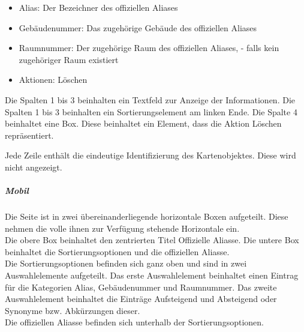 \begin{itemize}
    \item Alias: Der Bezeichner des offiziellen Aliases
    \item Gebäudenummer: Das zugehörige Gebäude des offiziellen Aliases
    \item Raumnummer: Der zugehörige Raum des offiziellen Aliases, \dq - \dq{} falls kein zugehöriger Raum existiert
    \item Aktionen: Löschen
\end{itemize}

Die Spalten 1 bis 3 beinhalten ein Textfeld zur Anzeige der Informationen.
Die Spalten 1 bis 3 beinhalten ein Sortierungselement am linken Ende.
Die Spalte 4 beinhaltet eine Box. Diese beinhaltet ein Element, dass die Aktion \dq Löschen \dq{} repräsentiert.

\begin{center}
    \captionsetup[figure]{labelformat=empty}
    \captionsetup[figure]{labelformat=default}
\end{center}

Jede Zeile enthält die eindeutige Identifizierung des Kartenobjektes. Diese wird nicht angezeigt.

\vspace{0.5em}
\begin{minipage}{\textwidth}
    \begin{minipage}{.5\textwidth}
        \subparagraph*{Mobil}
        Die Seite ist in zwei übereinanderliegende horizontale Boxen aufgeteilt. Diese nehmen die volle ihnen zur Verfügung stehende Horizontale ein. \\
        Die obere Box beinhaltet den zentrierten Titel \dq Offizielle Aliasse\dq.
        Die untere Box beinhaltet die Sortierungsoptionen und die offiziellen Aliasse. \\
        Die Sortierungsoptionen befinden sich ganz oben und sind in zwei Auswahlelemente aufgeteilt. 
        Das erste Auswahlelement beinhaltet einen Eintrag für die Kategorien Alias, Gebäudenummer und Raumnummer.
        Das zweite Auswahlelement beinhaltet die Einträge \dq Aufsteigend \dq{} und \dq Absteigend \dq{} oder Synonyme bzw. Abkürzungen dieser. \\
        Die offiziellen Aliasse befinden sich unterhalb der Sortierungsoptionen.
    \end{minipage}
    \begin{minipage}{.5\textwidth}
        \hspace{.2\textwidth}
        \captionsetup[figure]{labelformat=empty}
        \captionsetup[figure]{labelformat=default}    
    \end{minipage}
\end{minipage}
\vspace{0.5em}

